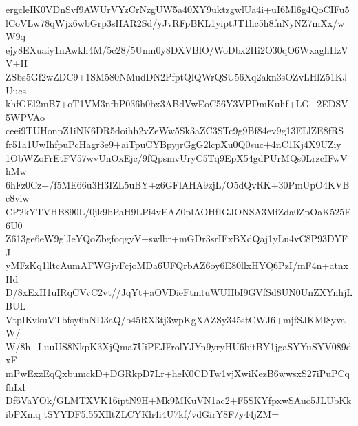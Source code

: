 ergcleIK0VDnSvf9AWUrVYzCrNzgUW5a40XY9uktzgwlUa4i+uI6Ml6g4QoCIFu5
lCoVLw78qWjx6wbGrp3sHAR2Sd/yJvRFpBKL1yiptJT1hc5h8fnNyNZ7mXx/wW9q
ejy8EXuaiy1nAwkh4M/5c28/5Umn0y8DXVBlO/WoDbx2Hi2O30qO6WxaghHzVV+H
ZSbs5Gf2wZDC9+1SM580NMudDN2PfptQlQWrQSU56Xq2akn3sOZvLHlZ51KJUucs
khfGEl2mB7+oT1VM3nfbP036h0bx3ABdVwEoC56Y3VPDmKuhf+LG+2EDSV5WPVAo
ceei9TUHonpZ1iNK6DR5doihh2vZeWw5Sk3aZC3STc9g9Bf84ev9g13ELlZE8fRS
fr51a1UwIhfpuPcHagr3e9+aiTpuCYBpyjrGgG2lcpXu0Q0suc+4nC1Kj4X9UZiy
1ObWZoFrEtFV57wvUnOxEjc/9fQpsmvUryC5Tq9EpX54gdPUrMQs0LrzcIFwVhMw
6hFz0Cz+/f5ME66u3H3IZL5uBY+z6GFlAHA9zjL/O5dQvRK+30PmUpO4KVBc8viw
CP2kYTVHB890L/0jk9bPaH9LPi4vEAZ0plAOHfIGJONSA3MiZda0ZpOaK525F6U0
Z613ge6eW9glJeYQoZbgfoqgyV+swlbr+mGDr3srIFxBXdQaj1yLu4vC8P93DYFJ
yMFzKq1lltcAumAFWGjvFcjoMDa6UFQrbAZ6oy6E80llxHYQ6PzI/mF4n+atnxHd
D/8xExH1uIRqCVvC2vt//JqYt+aOVDieFtmtuWUHbI9GVfSd8UN0UnZXYnhjLBUL
VtpIKvkuVTbfsy6nND3aQ/b45RX3tj3wpKgXAZSy345stCWJ6+mjfSJKMl8yvaW/
W/8h+LuuUS8NkpK3XjQma7UiPEJFrolYJYn9yryHU6bitBY1jgaSYYuSYV089dxF
mPwExzEqQxbumckD+DGRkpD7Lr+heK0CDTw1vjXwiKezB6wwsxS27iPuPCqfhIxl
Df6VaYOk/GLMTXVK16iptN9H+Mk9MKuVN1ac2+F5SKYfpxwSAuc5JLUbKkibPXmq
tSYYDF5i55XIltZLCYKh4i4U7kf/vdGirY8F/y44jZM=
